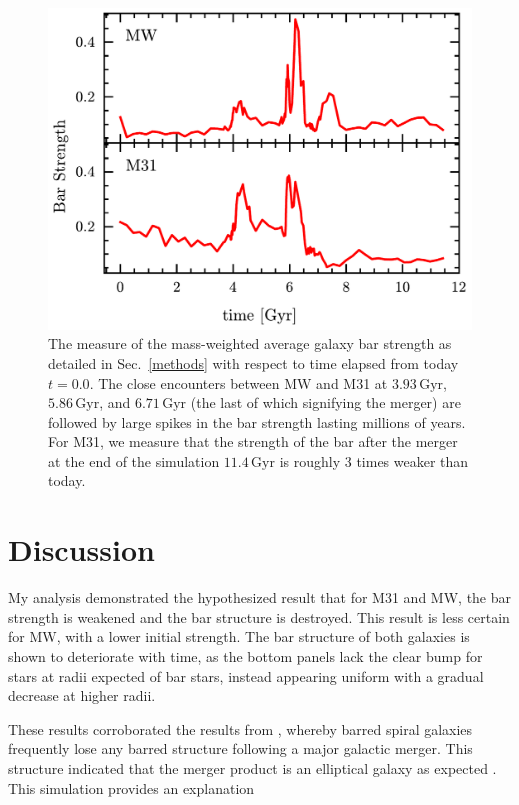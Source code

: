 \documentclass[twocolumn]{aastex631}
\DeclareRobustCommand{\Secref}[1]{Sec.~\ref{#1}}
\begin{document}
\begin{figure}[htbp]
  \centering
  \includegraphics[width=\columnwidth]{bar_strength}
  \caption{The measure of the mass-weighted average galaxy bar
    strength as detailed in \Secref{methods} with respect to time
    elapsed from today $t=0.0$. The close encounters between MW and
    M31 at $3.93\,\mathrm{Gyr}$, $5.86\,\mathrm{Gyr}$, and $6.71\,\mathrm{Gyr}$
    (the last of which signifying the merger) are followed by large
    spikes in the bar strength lasting millions of years. For M31, we
    measure that the strength of the bar after the merger at the end
    of the simulation $11.4\,\mathrm{Gyr}$ is roughly 3 times weaker than
    today.}
  \label{fig:galaxy}
\end{figure}


\section{Discussion}

My analysis demonstrated the hypothesized result that for M31 and MW,
the bar strength is weakened and the bar structure is destroyed. This
result is less certain for MW, with a lower initial strength. The bar
structure of both galaxies is shown to deteriorate with time, as the
bottom panels lack the clear bump for stars at radii expected of bar
stars, instead appearing uniform with a gradual decrease at higher
radii.

These results corroborated the results from \citet{elmegreen:07},
whereby barred spiral galaxies frequently lose any barred structure
following a major galactic merger. This structure indicated that the
merger product is an elliptical galaxy as expected
\citep[e.g.,][]{mutch:11}. This simulation provides an explanation
\end{document}
